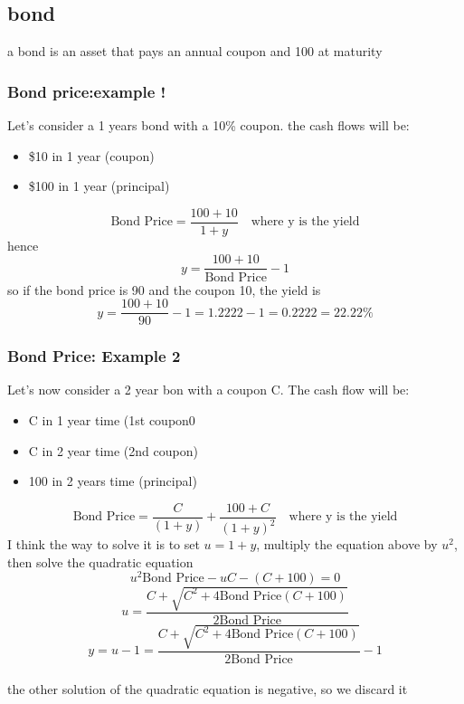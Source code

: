 \documentclass[12pt]{article}
\begin{document}
    \subsection{bond}
    a bond is an asset that pays an annual coupon and 100 at maturity
    \subsubsection{Bond price:example !} Let's consider a 1 years bond with a 10\% coupon. the cash flows will be:
    \begin{itemize}
        \item \$10 in 1 year (coupon)
        \item \$100 in 1 year (principal)
    \end{itemize}
    \[\text{Bond Price}=\frac{100+10}{1+y} \quad \text{where y is the yield}\]
    hence
    \[y=\frac{100+10}{\text{Bond Price}}-1\]
    so if the bond price is 90 and the coupon 10, the yield is
    \[y=\frac{100+10}{90}-1=1.2222-1=0.2222=22.22\%\]
    \subsubsection{Bond Price: Example 2}
    Let's now consider a 2 year bon with a coupon C. The cash flow will be:
    \begin{itemize}
        \item C in 1 year time (1st coupon0
        \item C in 2 year time (2nd coupon)
        \item 100 in 2 years time (principal)
    \end{itemize}
    \[\text{Bond Price}=\frac{C}{(1+y)}+\frac{100+C}{(1+y)^2} \quad \text{where y is the yield}\]
    I think the way to solve it is to set $u=1+y$, multiply the equation above by $u^2$, then solve the quadratic equation
    \[u^2\text{Bond Price}-uC-(C+100)=0\]
    \[u=\frac{C+\sqrt{C^2+4\text{Bond Price}(C+100)}}{2\text{Bond Price}}\]
    \[y=u-1=\frac{C+\sqrt{C^2+4\text{Bond Price}(C+100)}}{2\text{Bond Price}}-1\]
    \\the other solution of the quadratic equation is negative, so we discard it
\end{document}

